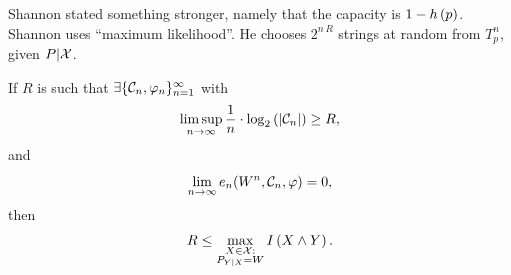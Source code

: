Shannon stated something stronger, namely that the capacity is $1 - h\left({p}\right)$.
Shannon uses ``maximum likelihood''.
He chooses $2^{n \, R}$ strings at random from $T^n_p$, given $P|\mathcal{X}$.

\begin{thm}
	If $R$ is such that $\exists \{\mathcal{C}_n, \varphi_n\}_{n=1}^\infty$ with
	\begin{equation*}
		\limsup_{n \to \infty}
		\frac{1}{n} \cdot \log_2 \left( {\left|{\mathcal{C}_n}\right|} \right) \ge R,
	\end{equation*}
	and
	\begin{equation*}
		\lim_{n \to \infty} e_n (W^n, \mathcal{C}_n, \varphi) = 0,
	\end{equation*}
	then
	\begin{equation*}
		R \le \max_{
			\substack{
				X \in \mathcal{X} : \\
				P_{Y|X} = W
			}
		}
		I \left( {X \land Y} \right).
	\end{equation*}
\end{thm}

